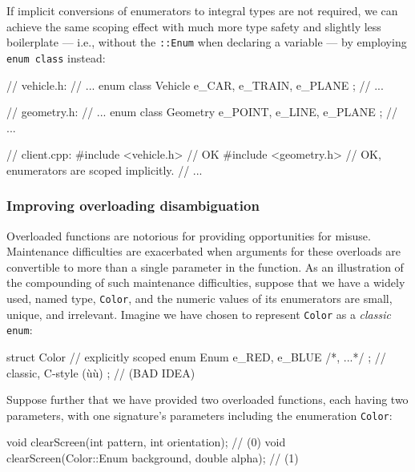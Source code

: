 \noindent If implicit conversions of enumerators to integral types are not
required, we can achieve the same scoping effect with much more type
safety and slightly less boilerplate --- i.e., without the
\texttt{::Enum} when declaring a variable --- by employing
\texttt{enum}~\texttt{class} instead:

\begin{emcppslisting}
// vehicle.h:
// ...
enum class Vehicle { e_CAR, e_TRAIN, e_PLANE };
// ...

// geometry.h:
// ...
enum class Geometry { e_POINT, e_LINE, e_PLANE };
// ...

// client.cpp:
#include <vehicle.h>  // OK
#include <geometry.h>   // OK, enumerators are scoped implicitly.
// ...
\end{emcppslisting}

\subsubsection[Improving overloading disambiguation]{Improving overloading disambiguation}\label{improving-overloading-disambiguation}

Overloaded functions are notorious for providing opportunities for
misuse. Maintenance difficulties are exacerbated when arguments for
these overloads are convertible to more than a single parameter in the
function. As an illustration of the compounding of such maintenance
difficulties, suppose that we have a widely used, named type,
\texttt{Color}, and the numeric values of its enumerators are small,
unique, and irrelevant. Imagine we have chosen to represent
\texttt{Color} as a \emph{classic} \texttt{enum}:

\begin{emcppslisting}[emcppsbatch=e7]
struct Color
{                                           // explicitly scoped
    enum Enum { e_RED, e_BLUE /*, ...*/ };  // classic, C-style (ù{}ù)
};                                          // (BAD IDEA)
\end{emcppslisting}

\noindent Suppose further that we have provided two overloaded functions, each
having two parameters, with one signature's parameters including the
enumeration \texttt{Color}:

\begin{emcppslisting}[emcppsbatch=e7]
void clearScreen(int pattern, int orientation);          // (0)
void clearScreen(Color::Enum background, double alpha);  // (1)
\end{emcppslisting}

